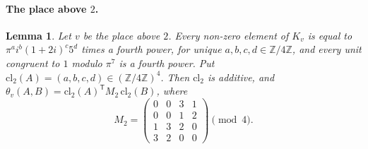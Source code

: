\documentclass[11pt]{article}
\newtheorem{lemma}[theorem]{Lemma}
\newcommand{\Z}{\mathbb{Z}}
\begin{document}
\paragraph{The place above $2$.}
\begin{lemma}\label{lem:cM2}
Let $v$ be the place above $2$. Every non-zero element of $K_v$ is equal to $\pi^a i^b(1+2i)^c5^d$ times a fourth power, for unique $a,b,c,d\in\Z/4\Z$, and every unit congruent to $1$ modulo $\pi^7$ is a fourth power. Put $\mathrm{cl}_2(A)=(a,b,c,d)\in(\Z/4\Z)^4$. Then $\mathrm{cl}_2$ is additive, and $\theta_v(A,B)=\mathrm{cl}_2(A)^{\mathsf T}M_2\,\mathrm{cl}_2(B)$, where
\[
M_2=\begin{pmatrix}0&0&3&1\\0&0&1&2\\1&3&2&0\\3&2&0&0\end{pmatrix}\pmod4.
\]
\end{lemma}
\end{document}
